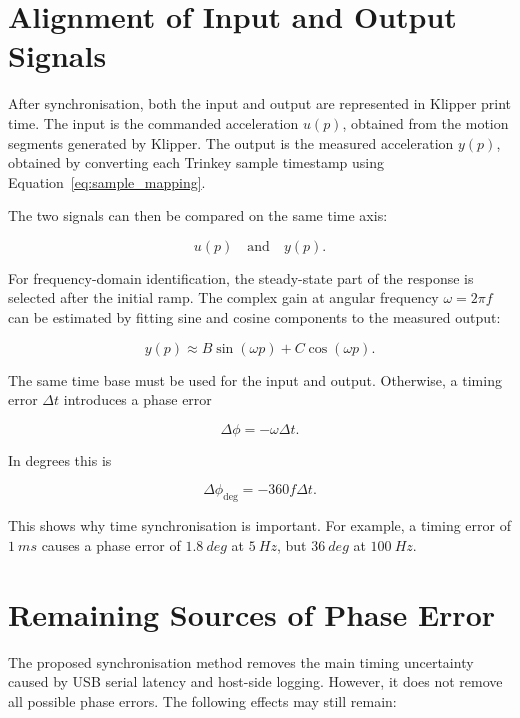 \documentclass[11pt,a4paper]{article}
\begin{document}
\section{Alignment of Input and Output Signals}

After synchronisation, both the input and output are represented in Klipper
print time. The input is the commanded acceleration \(u(p)\), obtained from the
motion segments generated by Klipper. The output is the measured acceleration
\(y(p)\), obtained by converting each Trinkey sample timestamp using
Equation~\eqref{eq:sample_mapping}.

The two signals can then be compared on the same time axis:

\begin{equation}
    u(p) \quad \text{and} \quad y(p).
\end{equation}

For frequency-domain identification, the steady-state part of the response is
selected after the initial ramp. The complex gain at angular frequency
\(\omega = 2\pi f\) can be estimated by fitting sine and cosine components to
the measured output:

\begin{equation}
    y(p) \approx B\sin(\omega p) + C\cos(\omega p).
\end{equation}

The same time base must be used for the input and output. Otherwise, a timing
error \(\Delta t\) introduces a phase error

\begin{equation}
    \Delta \phi = -\omega \Delta t.
\end{equation}

In degrees this is

\begin{equation}
    \Delta \phi_{\mathrm{deg}} =
    -360 f \Delta t.
\end{equation}

This shows why time synchronisation is important. For example, a timing error of
\(\SI{1}{ms}\) causes a phase error of \(\SI{1.8}{deg}\) at
\(\SI{5}{Hz}\), but \(\SI{36}{deg}\) at \(\SI{100}{Hz}\).

\section{Remaining Sources of Phase Error}

The proposed synchronisation method removes the main timing uncertainty caused
by USB serial latency and host-side logging. However, it does not remove all
possible phase errors. The following effects may still remain:
\end{document}
